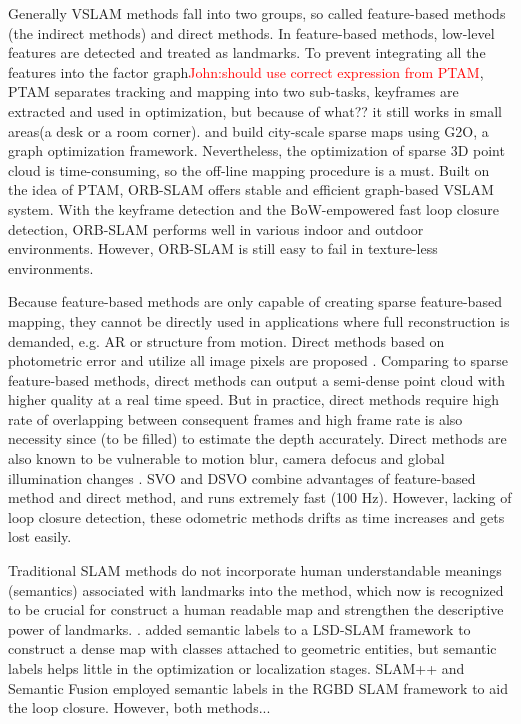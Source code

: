 \documentclass[journal]{IEEEtran}
\newcommand{\COMMENT}[1]{\textcolor{red}{#1}}
\begin{document}
Generally VSLAM methods fall into two groups, so called feature-based methods (the indirect methods) and direct methods. 
In feature-based methods, low-level features are detected and treated as landmarks. 
To prevent integrating all the features into the factor graph\COMMENT{John:should use correct expression from PTAM}, PTAM\cite{Klein2007Parallel} separates tracking and mapping into two sub-tasks, keyframes are extracted and used in optimization, but because of what?? it still works in small areas(a desk or a room corner). 
\cite{Lategahn2012City} and \cite{Lategahn2014Vision} build city-scale sparse maps using G2O, a graph optimization framework\citep{K2011G2o}. 
Nevertheless, the optimization of sparse 3D point cloud is time-consuming, so the off-line mapping procedure is a must. Built on the idea of PTAM\cite{Klein2007Parallel}, ORB-SLAM \cite{Mur2017ORB} offers stable and efficient graph-based VSLAM system.
With the keyframe detection and the BoW-empowered fast loop closure detection, ORB-SLAM performs well in various indoor and outdoor environments. 
However, ORB-SLAM is still easy to fail in texture-less environments.

%

Because feature-based methods are only capable of creating sparse feature-based mapping, they cannot be directly used in applications where full reconstruction is demanded, e.g. AR or structure from motion.
Direct methods based on photometric error and utilize all image pixels are proposed \citep{Engel2014LSD}.
Comparing to sparse feature-based methods, direct methods can output a semi-dense point cloud with higher quality at a real time speed. 
But in practice, direct methods require high rate of overlapping between consequent frames and high frame rate is also necessity since (to be filled) to estimate the depth accurately.
Direct methods are also known to be vulnerable to motion blur, camera defocus and global illumination changes \cite{Newcombe2011DTAM}. 
SVO \cite{Forster2013SVO} and DSVO\cite{} combine advantages of feature-based method and direct method, and runs extremely fast (100 Hz). 
However, lacking of loop closure detection, these odometric methods drifts as time increases and gets lost easily.
	

Traditional SLAM methods do not incorporate human understandable meanings (semantics) associated with landmarks into the method, which now is recognized to be crucial for construct a human readable map and strengthen the descriptive power of landmarks\citep{}.
\cite{Cadena:2016fp}. \cite{Li2016Semi} added semantic labels to a LSD-SLAM framework to construct a dense map with classes attached to geometric entities, but semantic labels helps little in the optimization or localization stages.
SLAM++ \cite{Salas2013SLAM} and Semantic Fusion \cite{Mccormac2017SemanticFusion} employed semantic labels in the RGBD SLAM framework to aid the loop closure. 
However, both methods...
\end{document}
